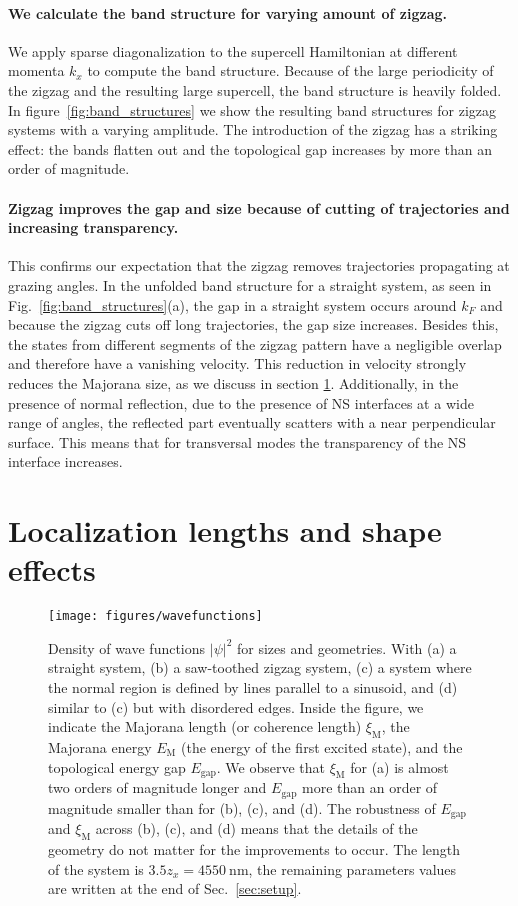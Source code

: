 \documentclass[english, twocolumn, 10pt, aps, superscriptaddress, floatfix, prb, citeautoscript]{revtex4-1}
\renewcommand{\comment}[2]{#2}
\renewcommand{\comment}{\paragraph}
\begin{document}
\comment{We calculate the band structure for varying amount of zigzag.}
We apply sparse diagonalization to the supercell Hamiltonian at different momenta $k_x$ to compute the band structure.
Because of the large periodicity of the zigzag and the resulting large supercell, the band structure is heavily folded.
In figure~\ref{fig:band_structures} we show the resulting band structures for zigzag systems with a varying amplitude.
The introduction of the zigzag has a striking effect: the bands flatten out and the topological gap increases by more than an order of magnitude.

\comment{Zigzag improves the gap and size because of cutting of trajectories and increasing transparency.}
This confirms our expectation that the zigzag removes trajectories propagating at grazing angles.
In the unfolded band structure for a straight system, as seen in Fig.~\ref{fig:band_structures}(a), the gap in a straight system occurs around $k_F$ and because the zigzag cuts off long trajectories, the gap size increases.
Besides this, the states from different segments of the zigzag pattern have a negligible overlap and therefore have a vanishing velocity.
This reduction in velocity strongly reduces the Majorana size, as we discuss in section \ref{sec:shape_effects}.
Additionally, in the presence of normal reflection, due to the presence of NS interfaces at a wide range of angles, the reflected part eventually scatters with a near perpendicular surface.
This means that for transversal modes the transparency of the NS interface increases.

\section{Localization lengths and shape effects}\label{sec:shape_effects}

\begin{figure}[!htb]
\texttt{[image: figures/wavefunctions]}
\caption{Density of wave functions $\left|\psi\right|^2$ for sizes and geometries.
With (a) a straight system, (b) a saw-toothed zigzag system, (c) a system where the normal region is defined by lines parallel to a sinusoid, and (d) similar to (c) but with disordered edges.
Inside the figure, we indicate the Majorana length (or coherence length) $\xi_\textrm{M}$, the Majorana energy $E_\textrm{M}$ (the energy of the first excited state), and the topological energy gap $E_\textrm{gap}$.
We observe that $\xi_\textrm{M}$ for (a) is almost two orders of magnitude longer and $E_\textrm{gap}$ more than an order of magnitude smaller than for (b), (c), and (d).
The robustness of $E_\textrm{gap}$ and $\xi_\textrm{M}$ across (b), (c), and (d) means that the details of the geometry do not matter for the improvements to occur.
The length of the system is $3.5 z_x=\SI{4550}{\nm}$, the remaining parameters values are written at the end of Sec.~\ref{sec:setup}.\label{fig:wave_functions}}
\end{figure}
\end{document}
